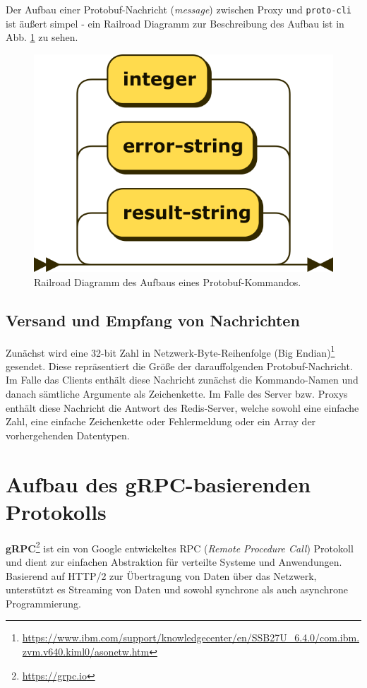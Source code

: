 \documentclass[a4paper,ngerman]{article}
\begin{document}
{Der Aufbau einer Protobuf-Nachricht (\textit{message}) zwischen Proxy und \texttt{proto-cli} ist äußert simpel - ein Railroad Diagramm zur Beschreibung des Aufbau ist in Abb. \ref{img:railroad-protobuf-structure} zu sehen.

\begin{figure}[H]
        \centering
        \includegraphics{protobuf}
        \caption{Railroad Diagramm des Aufbaus eines Protobuf-Kommandos.}
        \label{img:railroad-protobuf-structure}
\end{figure}

\subsection{Versand und Empfang von Nachrichten}
Zunächst wird eine 32-bit Zahl in Netzwerk-Byte-Reihenfolge (Big Endian)\footnote{\url{https://www.ibm.com/support/knowledgecenter/en/SSB27U_6.4.0/com.ibm.zvm.v640.kiml0/asonetw.htm}} gesendet. Diese repräsentiert die Größe der darauffolgenden Protobuf-Nachricht.
Im Falle das Clients enthält diese Nachricht zunächst die Kommando-Namen und danach sämtliche Argumente als Zeichenkette. Im Falle des Server bzw. Proxys enthält diese Nachricht die Antwort des Redis-Server, welche sowohl eine einfache Zahl, eine einfache Zeichenkette oder Fehlermeldung oder ein Array der vorhergehenden Datentypen.

\section{Aufbau des gRPC-basierenden Protokolls}
\textbf{gRPC}\footnote{\url{https://grpc.io}} ist ein von Google entwickeltes RPC (\textit{Remote Procedure Call}) Protokoll und dient zur einfachen Abstraktion für verteilte Systeme und Anwendungen. Basierend auf HTTP/2 zur Übertragung von Daten über das Netzwerk, unterstützt es Streaming von Daten und sowohl synchrone als auch asynchrone Programmierung.

}
\end{document}

